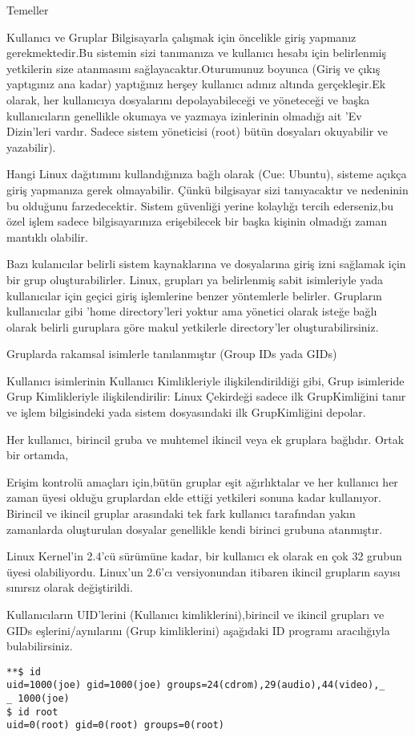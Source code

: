 \begin{section}{Temeller}
\begin{subsection}{Kullanıcı ve Gruplar}
Bilgisayarla çalışmak için öncelikle giriş yapmanız gerekmektedir.Bu sistemin sizi tanımanıza ve kullanıcı hesabı için belirlenmiş yetkilerin size atanmasını sağlayacaktır.Oturumunuz boyunca (Giriş ve çıkış yaptıgınız ana kadar) yaptığınız herşey kullanıcı adınız altında gerçekleşir.Ek olarak, her kullanıcıya dosyalarını depolayabileceği ve yöneteceği ve başka kullanıcıların genellikle okumaya ve yazmaya izinlerinin olmadığı ait 'Ev Dizin'leri vardır. Sadece sistem yöneticisi (root) bütün dosyaları okuyabilir ve yazabilir).

Hangi Linux dağıtımını kullandığınıza bağlı olarak (Cue: Ubuntu), sisteme açıkça giriş yapmanıza gerek olmayabilir. Çünkü bilgisayar sizi tanıyacaktır ve nedeninin bu olduğunu farzedecektir. Sistem güvenliği yerine kolaylığı tercih ederseniz,bu özel işlem sadece bilgisayarınıza erişebilecek bir başka kişinin olmadığı zaman mantıklı olabilir.

Bazı kulanıcılar belirli sistem kaynaklarına ve dosyalarına giriş izni sağlamak için bir grup oluşturabilirler. Linux, grupları ya belirlenmiş sabit isimleriyle yada kullanıcılar için geçici giriş işlemlerine benzer yöntemlerle belirler. Grupların kullanıcılar gibi 'home directory'leri yoktur ama yönetici olarak isteğe bağlı olarak belirli guruplara göre makul yetkilerle directory'ler oluşturabilirsiniz.

Gruplarda rakamsal isimlerle tanılanmıştır (Group IDs yada GIDs)

Kullanıcı isimlerinin Kullanıcı Kimlikleriyle ilişkilendirildiği gibi, Grup isimleride Grup Kimlikleriyle ilişkilendirilir: Linux Çekirdeği sadece ilk GrupKimliğini tanır ve işlem bilgisindeki yada sistem dosyasındaki ilk GrupKimliğini depolar.

Her kullanıcı, birincil gruba ve muhtemel ikincil veya ek gruplara bağlıdır. Ortak bir ortamda,

Erişim kontrolü amaçları için,bütün gruplar eşit ağırlıktalar ve her kullanıcı her zaman üyesi olduğu gruplardan elde ettiği yetkileri sonuna kadar kullanıyor. Birincil ve ikincil gruplar arasındaki tek fark kullanıcı tarafından yakın zamanlarda oluşturulan dosyalar genellikle kendi birinci grubuna atanmıştır.

Linux Kernel’in 2.4’cü sürümüne kadar, bir kullanıcı ek olarak en çok 32 grubun üyesi olabiliyordu. Linux’un 2.6’cı versiyonundan itibaren ikincil grupların sayısı sınırsız olarak değiştirildi.

Kullanıcıların UID’lerini (Kullanıcı kimliklerini),birincil ve ikincil grupları ve GIDs eşlerini/aynılarını (Grup kimliklerini) aşağıdaki ID programı aracılığıyla bulabilirsiniz.
\begin{verbatim}
**$ id
uid=1000(joe) gid=1000(joe) groups=24(cdrom),29(audio),44(video),_
_ 1000(joe)
$ id root
uid=0(root) gid=0(root) groups=0(root)
\end{verbatim}


\end{subsection}
\end{section}

